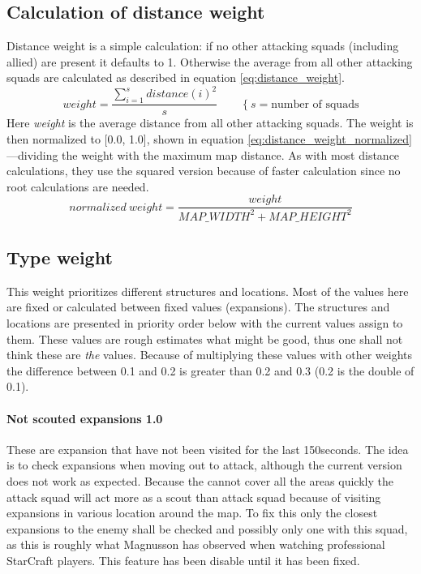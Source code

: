 \subsection{Calculation of distance weight}
Distance weight is a simple calculation: if no other attacking squads (including allied) are present it defaults to 1. Otherwise the average from all other attacking squads are calculated as described in equation \ref{eq:distance_weight}.
\begin{equation}
\label{eq:distance_weight}
weight = \frac{\sum_{i=1}^{s}{distance(i)^2}}{s} \qquad \left\{s = \text{number of squads}\right.
\end{equation}
Here \emph{weight} is the average distance from all other attacking squads. The weight is then normalized to [0.0, 1.0], shown in equation \ref{eq:distance_weight_normalized}—dividing the weight with the maximum map distance. As with most distance calculations, they use the squared version because of faster calculation since no root calculations are needed.
\begin{equation}
\label{eq:distance_weight_normalized}
normalized\ weight = \frac{weight}{MAP\_WIDTH^2 + MAP\_HEIGHT^2}
\end{equation}


\subsection{Type weight}
This weight prioritizes different structures and locations. Most of the values here are fixed or calculated between fixed values (expansions). The structures and locations are presented in priority order below with the current values assign to them. These values are rough estimates what might be good, thus one shall not think these are \emph{the} values. Because of multiplying these values with other weights the difference between 0.1 and 0.2 is greater than 0.2 and 0.3 (0.2 is the double of 0.1).

\paragraph{Not scouted expansions 1.0\conf}
These are expansion that have not been visited for the last 150\conf seconds. The idea is to check expansions when moving out to attack, although the current version does not work as expected. Because the  cannot cover all the areas quickly the attack squad will act more as a scout than attack squad because of visiting expansions in various location around the map. To fix this only the closest expansions to the enemy shall be checked and possibly only one with this squad, as this is roughly what Magnusson has observed when watching professional StarCraft players. This feature has been disable until it has been fixed.
	
